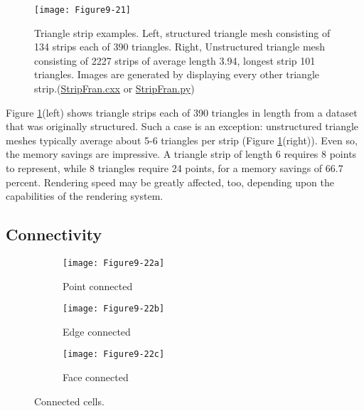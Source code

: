 \begin{figure}[!htb]
	\centering
	\texttt{[image: Figure9-21]}
	\caption{Triangle strip examples. Left, structured triangle mesh consisting of 134 strips each of 390 triangles. Right, Unstructured triangle mesh consisting of 2227 strips of average length 3.94, longest strip 101 triangles. Images are generated by displaying every other triangle strip.(\href{https://lorensen.github.io/VTKExamples/site/Cxx/Rendering/StripFran/}{StripFran.cxx} or \href{https://lorensen.github.io/VTKExamples/site/Python/Rendering/StripFran/}{StripFran.py})}
	\label{fig:Figure9-21}
\end{figure}


Figure \ref{fig:Figure9-21}(left) shows triangle strips each of 390 triangles in length from a dataset that was originally structured. Such a case is an exception: unstructured triangle meshes typically average about 5-6 triangles per strip (Figure \ref{fig:Figure9-21}(right)). Even so, the memory savings are impressive. A triangle strip of length 6 requires 8 points to represent, while 8 triangles require 24 points, for a memory savings of 66.7 percent. Rendering speed may be greatly affected, too, depending upon the capabilities of the rendering system.

\subsection{Connectivity}
\label{subsec:connectivity}

\begin{figure}[htb]
	\begin{subfigure}[h]{0.32\linewidth}
		\texttt{[image: Figure9-22a]}
		\captionsetup{justification=centering}
		\caption*{Point connected}
		\label{fig:Figure9-22a}
	\end{subfigure}
	\hfill
	\begin{subfigure}[h]{0.32\linewidth}
		\texttt{[image: Figure9-22b]}
		\captionsetup{justification=centering}
		\caption*{Edge connected}
		\label{fig:Figure9-22b}
	\end{subfigure}
	\begin{subfigure}[h]{0.32\linewidth}
		\texttt{[image: Figure9-22c]}
		\captionsetup{justification=centering}
		\caption*{Face connected}
		\label{fig:Figure9-22c}
	\end{subfigure}
	\caption{Connected cells.}\label{fig:Figure9-22}
\end{figure}

